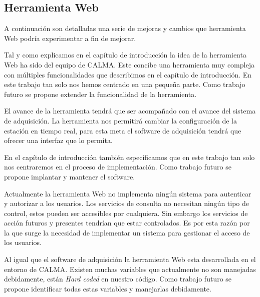	\subsection{Herramienta Web}
		A continuación son detalladas una serie de mejoras y cambios que herramienta Web podría experimentar a fin de mejorar.
		\begin{description}[style=unboxed,leftmargin=0cm,labelwidth=1cm]
			\item[Extender funcionalidad]
				Tal y como explicamos en el capítulo de introducción la idea de la herramienta Web ha sido del equipo de CALMA. Este
				concibe una herramienta muy compleja con múltiples funcionalidades que describimos en el capítulo de introducción. En
				este trabajo tan solo nos hemos centrado en una pequeña parte. Como trabajo futuro se propone extender la
				funcionalidad de la herramienta.
				\par
				El avance de la herramienta tendrá que ser acompañado con el avance del sistema de adquisición. La herramienta nos
				permitirá cambiar la configuración de la estación en tiempo real, para esta meta el software de adquisición tendrá que
				ofrecer una interfaz que lo permita.
			\item[Implantación y mantenimiento]
				En el capítulo de introducción también especificamos que en este trabajo tan solo nos centraremos en el proceso de
				implementación. Como trabajo futuro se propone implantar y mantener el software.
			\item[Autenticación y autorización]
				Actualmente la herramienta Web no implementa ningún sistema para autenticar y autorizar a los usuarios. Los servicios
				de consulta no necesitan ningún tipo de control, estos pueden ser accesibles por cualquiera. Sin embargo los servicios
				de acción futuros y presentes tendrían que estar controlados. Es por esta razón por la que surge la necesidad de
				implementar un sistema para gestionar el acceso de los usuarios. 
			\item[Adaptación para otras estaciones]
				Al igual que el software de adquisición la herramienta Web esta desarrollada en el entorno de CALMA. Existen muchas
				variables que actualmente no son manejadas debidamente, están \emph{Hard coded} en nuestro código. Como trabajo futuro
				se propone identificar todas estas variables y manejarlas debidamente.
		\end{description}
